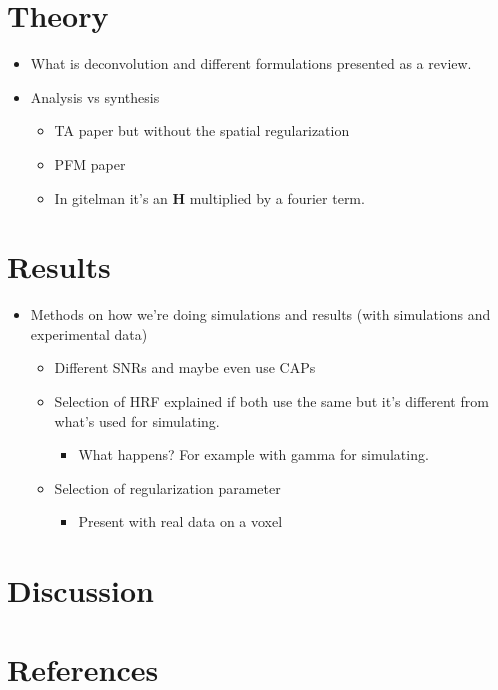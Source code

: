 \documentclass[5p]{elsarticle}
\begin{document}
\section{Theory}

\begin{itemize}
    \item What is deconvolution and different formulations presented as a review.
    \item Analysis vs synthesis
    \begin{itemize}
        \item TA paper but without the spatial regularization
        \item PFM paper
        \item In gitelman it's an $\mathbf{H}$ multiplied by a fourier term.
    \end{itemize}
\end{itemize}

\section{Results}

\begin{itemize}
    \item Methods on how we're doing simulations and results (with simulations and experimental data)
    \begin{itemize}
        \item Different SNRs and maybe even use CAPs
        \item Selection of HRF explained if both use the same but it's different from what's used for simulating.
        \begin{itemize}
            \item What happens? For example with gamma for simulating.
        \end{itemize}
        \item Selection of regularization parameter
        \begin{itemize}
            \item Present with real data on a voxel
        \end{itemize}
    \end{itemize}
\end{itemize}

\section{Discussion}

\section*{References}


\end{document}
